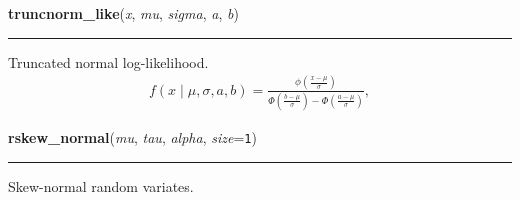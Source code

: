     \begin{boxedminipage}{\textwidth}

    \raggedright \textbf{truncnorm\_like}(\textit{x}, \textit{mu}, \textit{sigma}, \textit{a}, \textit{b})

    \vspace{-1.5ex}

    \rule{\textwidth}{0.5\fboxrule}

Truncated normal log-likelihood.
\begin{equation*}\begin{split}f(x \mid \mu, \sigma, a, b) = \frac{\phi(\frac{x-\mu}{\sigma})} {\Phi(\frac{b-\mu}{\sigma}) - \Phi(\frac{a-\mu}{\sigma})},\end{split}\end{equation*}    \vspace{1ex}

    \end{boxedminipage}

    \label{pymc:distributions:rskew_normal}

    \vspace{0.5ex}

    \begin{boxedminipage}{\textwidth}

    \raggedright \textbf{rskew\_normal}(\textit{mu}, \textit{tau}, \textit{alpha}, \textit{size}=\texttt{1})

    \vspace{-1.5ex}

    \rule{\textwidth}{0.5\fboxrule}

Skew-normal random variates.
    \vspace{1ex}

    \end{boxedminipage}

    \label{pymc:distributions:skew_normal_like}

    \vspace{0.5ex}

